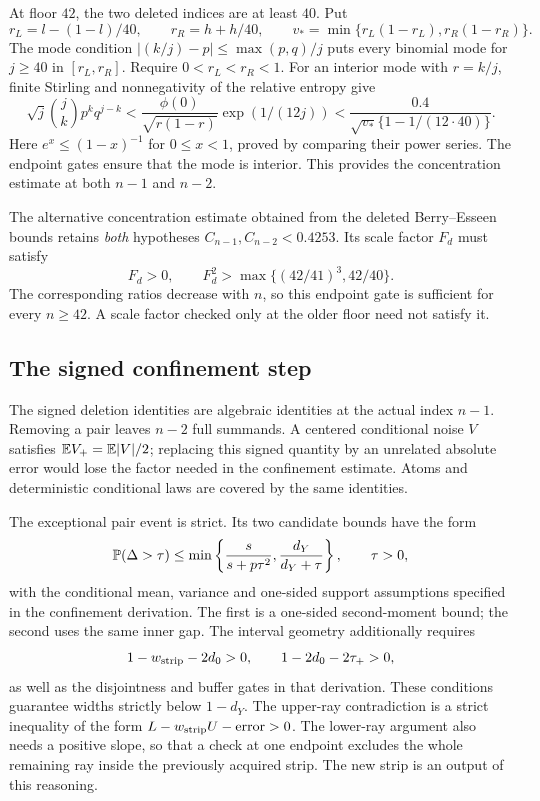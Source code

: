 At floor $42$, the two deleted indices are at least $40$. Put
\[
 r_L=l-(1-l)/40,\qquad r_R=h+h/40,
 \qquad v_*=\min\{r_L(1-r_L),r_R(1-r_R)\}.
\]
The mode condition $|(k/j)-p|\le\max(p,q)/j$ puts every binomial mode
for $j\ge40$ in $[r_L,r_R]$. Require $0<r_L<r_R<1$.
For an interior mode with $r=k/j$, finite Stirling and nonnegativity of
the relative entropy give
\[
 \sqrt j\binom jk p^kq^{j-k}
 <\frac{\phi(0)}{\sqrt{r(1-r)}}\exp(1/(12j))
 <\frac{0.4}{\sqrt{v_*}\{1-1/(12\cdot40)\}}.
\]
Here $e^x\le(1-x)^{-1}$ for $0\le x<1$, proved by comparing their
power series. The endpoint gates ensure that the mode is interior.
This provides the concentration estimate at both $n-1$ and $n-2$.

The alternative concentration estimate obtained from the deleted
Berry--Esseen bounds retains \emph{both} hypotheses
$C_{n-1},C_{n-2}<0.4253$. Its scale factor $F_d$ must satisfy
\[
 F_d>0,\qquad F_d^2>\max\{(42/41)^3,42/40\}.
\]
The corresponding ratios decrease with $n$, so this endpoint gate is
sufficient for every $n\ge42$. A scale factor checked only at the older
floor need not satisfy it.

\subsection{The signed confinement step}

The signed deletion identities are algebraic identities at the actual
index $n-1$. Removing a pair leaves $n-2$ full summands. A centered
conditional noise $V$ satisfies $\mathbb E V_+=\mathbb E|V|/2$; replacing this signed
quantity by an unrelated absolute error would lose the factor needed
in the confinement estimate. Atoms and deterministic conditional laws
are covered by the same identities.

The exceptional pair event is strict. Its two candidate bounds have
the form
\[
 \mathbb P(\Delta>\tau)\le
 \min\left\{\frac{s}{s+p\tau^2},\frac{d_Y}{d_Y+\tau}\right\},
 \qquad \tau>0,
\]
with the conditional mean, variance and one-sided support assumptions
specified in the confinement derivation. The first is a one-sided
second-moment bound; the second uses the same inner gap. The interval
geometry additionally requires
\[
 1-w_{\rm strip}-2d_0>0,\qquad 1-2d_0-2\tau_+>0,
\]
as well as the disjointness and buffer gates in that derivation. These
conditions guarantee widths strictly below $1-d_Y$. The upper-ray
contradiction is a strict inequality of the form
$L-w_{\rm strip} U-\mathrm{error}>0$. The lower-ray argument also needs a
positive slope, so that a check at one endpoint excludes the whole
remaining ray inside the previously acquired strip. The new strip is
an output of this reasoning.


